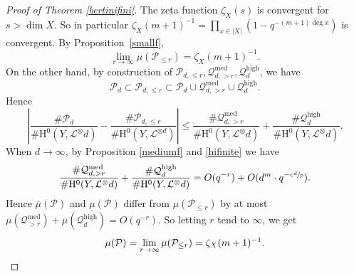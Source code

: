 \documentclass[JEP,XML,SOM,Unicode,published]{cedram}
\theoremstyle{plain}
\theoremstyle{definition}
\newcommand{\ho}{\mathrm{H}}
\newcommand{\li}{\mathcal{L}}
\begin{document}
\begin{proof}[Proof of Theorem \ref{bertinifini}]
The zeta function $\zeta_X(s)$ is convergent for $s>\dim X$. So in particular $\zeta_X(m+1)^{-1}=\prod_{x\in |X|}(1-q^{-(m+1)\deg x})$ is convergent. By Proposition~\ref{smallf},
\[
\lim_{r\to \infty}\mu(\mathcal{P}_{\leq r})=\zeta_X(m+1)^{-1}.
\]
On the other hand, by construction of $\mathcal{P}_{d,\leq r},\mathcal{Q}_{d, >r}^{\mathrm{med}},\mathcal{Q}_{d}^{\mathrm{high}}$, we have
\[
\mathcal{P}_{d} \subset \mathcal{P}_{d,\leq r} \subset \mathcal{P}_{d}\cup \mathcal{Q}_{d, >r}^{\mathrm{med}}\cup \mathcal{Q}_{d}^{\mathrm{high}}.
\]
Hence
\[
\left| \frac{ \#\mathcal{P}_{d}}{\# \ho^0(Y, \mathcal{L}^\otimes{d})} -\frac{\#\mathcal{P}_{d,\leq r}}{\#\ho^0(Y, \li^{\otimes d})} \right|\leq \frac{ \#\mathcal{Q}_{d, >r}^{\mathrm{med}}}{\# \ho^0(Y, \mathcal{L}^\otimes{d})}+\frac{ \#\mathcal{Q}_{d}^{\mathrm{high}}}{\# \ho^0(Y, \mathcal{L}^\otimes{d})}.
\]
When $d\to \infty$, by Proposition \ref{mediumf} and \ref{hifinite} we have
\[
\frac{ \#\mathcal{Q}_{d, >r}^{\mathrm{med}}}{\# \ho^0(Y, \mathcal{L}^\otimes{d})}+\frac{ \#\mathcal{Q}_{d}^{\mathrm{high}}}{\# \ho^0(Y, \mathcal{L}^\otimes{d})}
=O(q^{-r})+O(d^{m}\cdot q^{-c\sfrac{d}{p}}).
\]
Hence $\overline{\mu}(\mathcal{P})$ and $\underline{\mu}(\mathcal{P})$ differ from $\mu(\mathcal{P}_{\leq r})$ by at most $\overline{\mu}(\mathcal{Q}_{>r}^{\mathrm{med}})+\overline{\mu}(\mathcal{Q}_{d}^{\mathrm{high}})=O(q^{-r})$. So letting $r$ tend to $\infty$, we get
\[
\mu(\mathcal{P})=\lim_{r\to \infty}\mu(\mathcal{P}_{\leq r})=\zeta_X(m+1)^{-1}.\qedhere
\]
\end{proof}

\backmatter


\end{document}
